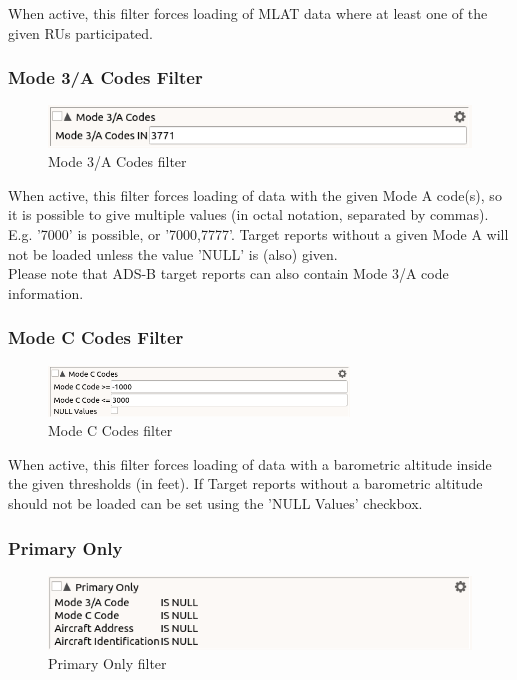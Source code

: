 When active, this filter forces loading of MLAT data where at least one of the given RUs participated.

\subsubsection{Mode 3/A Codes Filter}

\begin{figure}[H]
  \center
    \includegraphics[width=12cm,frame]{figures/filter_mode3a.png}
  \caption{Mode 3/A Codes filter}
\end{figure}

When active, this filter forces loading of data with the given Mode A code(s), so it is possible to give multiple values (in octal notation, separated by commas). E.g. '7000' is possible, or '7000,7777'. Target reports without a given Mode A will not be loaded unless the value 'NULL' is (also) given. \\

Please note that ADS-B target reports can also contain Mode 3/A code information.

\subsubsection{Mode C Codes Filter}

\begin{figure}[H]
  \center
    \includegraphics[width=8cm,frame]{figures/filter_modec.png}
  \caption{Mode C Codes filter}
\end{figure}

When active, this filter forces loading of data with a barometric altitude inside the given thresholds (in feet). If Target reports without a barometric altitude should not be loaded can be set using the 'NULL Values' checkbox.

\subsubsection{Primary Only}

\begin{figure}[H]
  \center
    \includegraphics[width=12cm,frame]{figures/filter_primary_only.png}
  \caption{Primary Only filter}
\end{figure}

